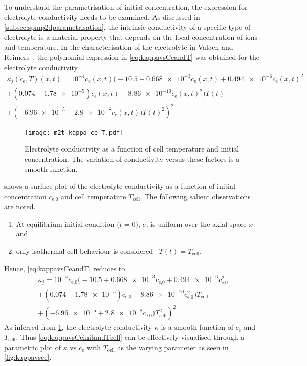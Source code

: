 To  understand  the parametrisation  of  initial  concentration, the  expression
for   electrolyte   conductivity   needs    to   be   examined.   As   discussed
in \cref{subsec:spmp2dparametrisation}, the intrinsic conductivity of a specific
type  of  electrolyte  is  a  material   property  that  depends  on  the  local
concentration of  ions and  temperature. In the characterisation of the
electrolyte in Valøen and  Reimers~\cite{Valoen2005}, the polynomial expression
in \cref{eq:kappavsCeandT} was obtained for the electrolyte conductivity.
\begin{multline}\label{eq:kappavsCeandT}
    \kappa_j(c_\text{e},T)(x,t) =  10^{-4} c_\text{e}(x,t) \bigl(-10.5 + \num{0.668e-3} c_\text{e}(x,t) + \num{0.494e-6}  c_\text{e}{(x,t)}^2\\
    + (0.074 - \num{1.78e-5}) c_\text{e}(x,t) - \num{8.86e-10} c_\text{e}{(x,t)}^2 \bigr)T(t)\\
	+ \left(\num{-6.96e-5} + \num{2.8e-8} c_\text{e}{(x,t)})T(t)^2\right)^2
\end{multline}

\begin{figure}[!htbp]
    \centering
    \texttt{[image: m2t\_kappa\_ce\_T.pdf]}
    \caption[Surface plot of electrolyte conductivity]
    {Electrolyte conductivity as a function of cell temperature and initial
        concentration. The variation of conductivity versus these factors is a
    smooth function.}
    \label{fig:kappavsCeandT}
\end{figure}

 shows  a surface  plot of the  electrolyte conductivity
as  a function  of  initial concentration  $c_\text{e,0}$  and cell  temperature
$T_\text{cell}$. The following salient observations are noted.
\begin{enumerate}%
    \item At  equilibrium  initial condition ($t=0$), $c_\text{e}$ is uniform over the axial space $x$ and
    \item only isothermal cell behaviour is considered \ie~$T(t) = T_\text{cell}$.
\end{enumerate}
Hence, \cref{eq:kappavsCeandT} reduces to
\begin{multline}\label{eq:kappavsCeinitandTcell}
    \kappa_j =  10^{-4} c_\text{e,0} \bigl(-10.5 + \num{0.668e-3} c_\text{e,0} + \num{0.494e-6}  c_\text{e,0}^2\\
        + (0.074 - \num{1.78e-5}) c_\text{e,0} - \num{8.86e-10}
    c_\text{e,0}^2 \bigr)T_\text{cell}\\
	+ \left(\num{-6.96e-5} + \num{2.8e-8} c_\text{e,0})T_\text{cell}^2\right)^2
\end{multline}
As   inferred   from \cref{fig:kappavsCeandT},  the   electrolyte   conductivity
$\kappa$   is   a  smooth   function   of   $c_\text{e}$  and   $T_\text{cell}$.
Thus \cref{eq:kappavsCeinitandTcell}  can be  effectively  visualised through  a
parametric plot of $\kappa$ vs  $c_\text{e}$ with $T_\text{cell}$ as the varying
parameter as seen in \cref{fig:kappavsce}.

